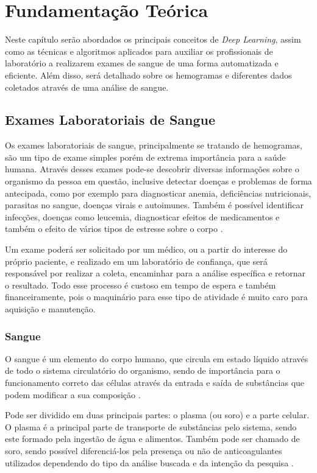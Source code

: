 \chapter{Fundamentação Teórica}
\label{chap:fund}

Neste capítulo serão abordados os principais conceitos de \emph{Deep Learning}, assim como as técnicas e algoritmos aplicados para auxiliar os profissionais de laboratório a realizarem exames de sangue de uma forma automatizada e eficiente. Além disso, será detalhado sobre os hemogramas e diferentes dados coletados através de uma análise de sangue.

\section{Exames Laboratoriais de Sangue}
\label{sec:conceito1}
Os exames laboratoriais de sangue, principalmente se tratando de hemogramas, são um tipo de exame simples porém de extrema importância para a saúde humana. Através desses exames pode-se descobrir diversas informações sobre o organismo da pessoa em questão, inclusive detectar doenças e problemas de forma antecipada, como por exemplo para diagnosticar anemia, deficiências nutricionais, parasitas no sangue, doenças virais e autoimunes. Também é possível identificar infecções, doenças como leucemia, diagnosticar efeitos de medicamentos e também o efeito de vários tipos de estresse sobre o corpo \cite{abcOfCbc, atlasDeHematologiaEAnalise}.

Um exame poderá ser solicitado por um médico, ou a partir do interesse do próprio paciente, e realizado em um laboratório de confiança, que será responsável por realizar a coleta, encaminhar para a análise específica e retornar o resultado. Todo esse processo é custoso em tempo de espera e também financeiramente, pois o maquinário para esse tipo de atividade é muito caro para aquisição e manutenção.

\subsection{Sangue}
O sangue é um elemento do corpo humano, que circula em estado líquido através de todo o sistema circulatório do organismo, sendo de importância para o funcionamento correto das células através da entrada e saída de substâncias que podem modificar a sua composição \cite{manualHematologia}.

Pode ser dividido em duas principais partes: o plasma (ou soro) e a parte celular. O plasma é a principal parte de transporte de substâncias pelo sistema, sendo este formado pela ingestão de água e alimentos. Também pode ser chamado de soro, sendo possível diferenciá-los pela presença ou não de anticoagulantes utilizados dependendo do tipo da análise buscada e da intenção da pesquisa \cite{manualHematologia}.

